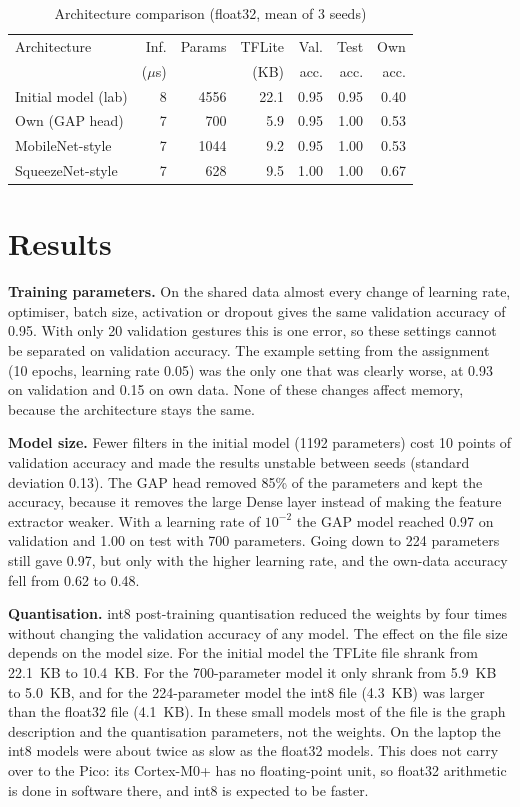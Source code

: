 \documentclass[conference]{IEEEtran}
\begin{document}
\begin{table}[t]
\caption{Architecture comparison (float32, mean of 3 seeds)}
\label{tab:arch}
\centering
\footnotesize
\setlength{\tabcolsep}{3pt}
\begin{tabular}{lrrrrrr}
\toprule
Architecture & Inf. & Params & TFLite & Val. & Test & Own \\
             & ($\mu$s) &   & (KB)   & acc. & acc. & acc. \\
\midrule
Initial model (lab)  & 8 & 4556 & 22.1 & 0.95 & 0.95 & 0.40 \\
Own (GAP head)       & 7 & 700  & 5.9  & 0.95 & 1.00 & 0.53 \\
MobileNet-style      & 7  & 1044 & 9.2  & 0.95 & 1.00 & 0.53 \\
SqueezeNet-style     & 7 & 628  & 9.5  & 1.00 & 1.00 & 0.67 \\
\bottomrule
\end{tabular}
\end{table}

\section{Results}

\textbf{Training parameters.} On the shared data almost every change of
learning rate, optimiser, batch size, activation or dropout gives the same
validation accuracy of 0.95. With only 20 validation gestures this is one
error, so these settings cannot be separated on validation accuracy. The
example setting from the assignment (10 epochs, learning rate 0.05) was the
only one that was clearly worse, at 0.93 on validation and 0.15 on own data.
None of these changes affect memory, because the architecture stays the
same.

\textbf{Model size.} Fewer filters in the initial model (1192 parameters)
cost 10 points of validation accuracy and made the results unstable between
seeds (standard deviation 0.13). The GAP head removed 85\% of the
parameters and kept the accuracy, because it removes the large Dense layer
instead of making the feature extractor weaker. With a learning rate of
$10^{-2}$ the GAP model reached 0.97 on validation and 1.00 on test with
700 parameters. Going down to 224 parameters still gave 0.97, but only with
the higher learning rate, and the own-data accuracy fell from 0.62 to 0.48.

\textbf{Quantisation.} int8 post-training quantisation reduced the weights
by four times without changing the validation accuracy of any model. The
effect on the file size depends on the model size. For the initial model the
TFLite file shrank from 22.1~KB to 10.4~KB. For the 700-parameter model it
only shrank from 5.9~KB to 5.0~KB, and for the 224-parameter model the int8
file (4.3~KB) was larger than the float32 file (4.1~KB). In these small
models most of the file is the graph description and the quantisation
parameters, not the weights. On the laptop the int8 models were about
twice as slow as the float32 models. This does not carry over to the Pico:
its Cortex-M0+ has no floating-point unit, so float32 arithmetic is done in
software there, and int8 is expected to be faster.
\end{document}
